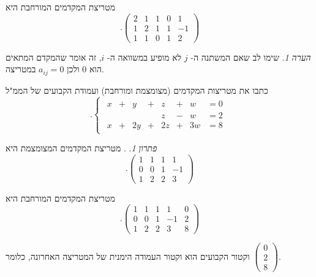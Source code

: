 \documentclass[
  hebrew,
  12pt,
  a4paper,
  oneside]{book}
\theoremstyle{definition}
\theoremstyle{remark}
\theoremstyle{plain}
\theoremstyle{remark}
\newtheorem*{remark}{הערה}
\newtheorem*{solution}{פתרון}
\begin{document}
\begin{example}
\begin{enumerate}
  מטריצת המקדמים המורחבת היא \[.\left( \begin{array}{cccc|c}
      2 & 1 & 1 & 0 & 1\\
      1 & 2 & 1 & 1 & -1\\
      1 & 1 & 0 & 1 & 2
  \end{array} \right)\]
\end{enumerate}

\end{example}

\begin{remark}
שימו לב שאם המשתנה ה- \(j\) לא מופיע במשוואה ה- \(i\), זה אומר שהמקדם
המתאים הוא \(0\) ולכן \(a_{ij}=0\) במטריצה.
\end{remark}

\begin{exercise}

כתבו את מטריצות המקדמים (מצומצמת ומורחבת) ועמודת הקבועים של הממ"ל
\[.\begin{cases}
\begin{alignedat}{7}
 x &{}+{}&  y &{}+{}&  z &{}+{}&  w &=  0 \\[4pt]
    &     &     &     &  z &{}-{}&  w &=  2 \\[4pt]
 x &{}+{}& 2y &{}+{}& 2z &{}+{}& 3w &=  8
\end{alignedat}
\end{cases}\]

\end{exercise}

\begin{solution}
. מטריצת המקדמים המצומצמת היא \[.\begin{pmatrix}1 & 1 & 1 & 1\\
0 & 0 & 1 & -1\\
1 & 2 & 2 & 3
\end{pmatrix}\]

מטריצת המקדמים המורחבת היא \[.\left( \begin{array}{cccc|c}
    1 & 1 & 1 & 1 & 0\\
    0 & 0 & 1 & -1 & 2\\
    1 & 2 & 2 & 3 & 8
\end{array} \right)\]

וקטור הקבועים הוא וקטור העמודה הימנית של המטריצה האחרונה, כלומר
\(\begin{pmatrix}
0 \\
2 \\
8
\end{pmatrix}\).
\end{solution}
\end{document}
